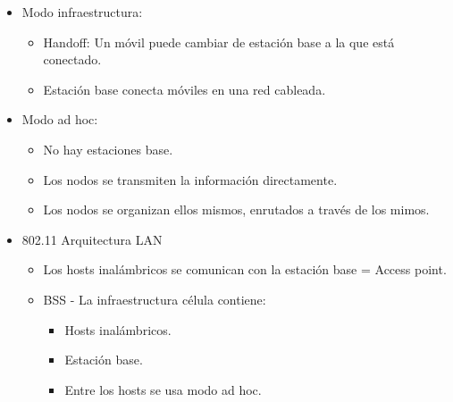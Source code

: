 \documentclass[12pt, twoside, openright]{report} %
\begin{document}
\begin{itemize}
	\item Modo infraestructura:
	      \begin{itemize}
		      \item Handoff: Un móvil puede cambiar de estación base a la que está conectado.
		      \item Estación base conecta móviles en una red cableada.
	      \end{itemize}

	\item Modo ad hoc:
	      \begin{itemize}
		      \item No hay estaciones base.
		      \item Los nodos se transmiten la información directamente.
		      \item Los nodos se organizan ellos mismos, enrutados a través de los mimos.
	      \end{itemize}

	\item 802.11 Arquitectura LAN
	      \begin{itemize}
		      \item Los hosts inalámbricos se comunican con la estación base = Access point.
		      \item BSS - La infraestructura célula contiene:
		            \begin{itemize}
			            \item Hosts inalámbricos.
			            \item Estación base.
			            \item Entre los hosts se usa modo ad hoc.
		            \end{itemize}


\end{itemize}
\end{itemize}
\end{document}
